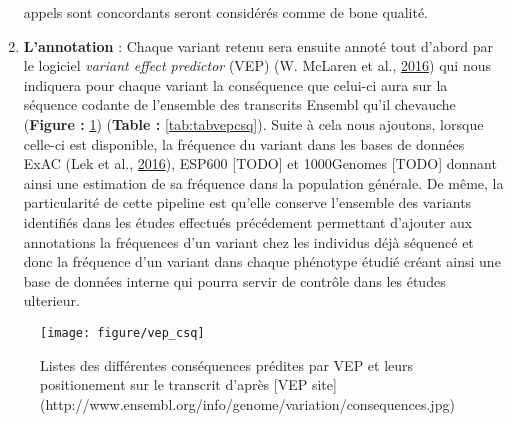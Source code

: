 \documentclass[12pt,twoside]{reedthesis}
\theoremstyle{definition}
\theoremstyle{definition}
\theoremstyle{remark}
\begin{document}
\begin{enumerate}
    appels sont concordants seront considérés comme de bone qualité.\\
  \item
    \textbf{L'annotation} : Chaque variant retenu sera ensuite annoté tout
    d'abord par le logiciel \emph{variant effect predictor} (VEP) (W.
    McLaren et al., \protect\hyperlink{ref-McLaren2016}{2016}) qui nous
    indiquera pour chaque variant la conséquence que celui-ci aura sur la
    séquence codante de l'ensemble des transcrits Ensembl qu'il chevauche
    (\textbf{Figure : }\ref{fig:figvepcsq}) (\textbf{Table :
    }\ref{tab:tabvepcsq}). Suite à cela nous ajoutons, lorsque celle-ci
    est disponible, la fréquence du variant dans les bases de données ExAC
    (Lek et al., \protect\hyperlink{ref-Lek2016}{2016}), ESP600 {[}TODO{]}
    et 1000Genomes {[}TODO{]} donnant ainsi une estimation de sa fréquence
    dans la population générale. De même, la particularité de cette
    pipeline est qu'elle conserve l'ensemble des variants identifiés dans
    les études effectués précédement permettant d'ajouter aux annotations
    la fréquences d'un variant chez les individus déjà séquencé et donc la
    fréquence d'un variant dans chaque phénotype étudié créant ainsi une
    base de données interne qui pourra servir de contrôle dans les études
    ulterieur.
  \end{enumerate}
  
  \begin{figure}
  
  {\centering \texttt{[image: figure/vep\_csq]} 
  
  }
  
  \caption[Listes des différentes conséquences prédites par VEP et leurs positionement sur le transcrit]{Listes des différentes conséquences prédites par VEP et leurs positionement sur le transcrit d'après [VEP site](http://www.ensembl.org/info/genome/variation/consequences.jpg)}\label{fig:figvepcsq}
  \end{figure}
  
\end{document}
